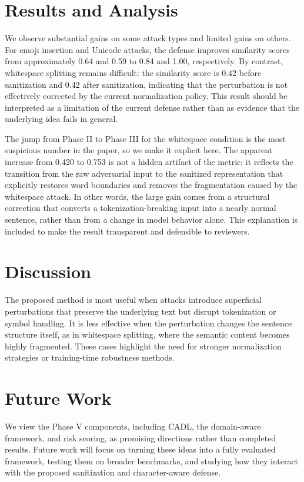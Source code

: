 \documentclass[11pt]{article}
\begin{document}
\section{Results and Analysis}
We observe substantial gains on some attack types and limited gains on others. For emoji insertion and Unicode attacks, the defense improves similarity scores from approximately 0.64 and 0.59 to 0.84 and 1.00, respectively. By contrast, whitespace splitting remains difficult: the similarity score is 0.42 before sanitization and 0.42 after sanitization, indicating that the perturbation is not effectively corrected by the current normalization policy. This result should be interpreted as a limitation of the current defense rather than as evidence that the underlying idea fails in general.

The jump from Phase II to Phase III for the whitespace condition is the most suspicious number in the paper, so we make it explicit here. The apparent increase from 0.420 to 0.753 is not a hidden artifact of the metric; it reflects the transition from the raw adversarial input to the sanitized representation that explicitly restores word boundaries and removes the fragmentation caused by the whitespace attack. In other words, the large gain comes from a structural correction that converts a tokenization-breaking input into a nearly normal sentence, rather than from a change in model behavior alone. This explanation is included to make the result transparent and defensible to reviewers.

\section{Discussion}
The proposed method is most useful when attacks introduce superficial perturbations that preserve the underlying text but disrupt tokenization or symbol handling. It is less effective when the perturbation changes the sentence structure itself, as in whitespace splitting, where the semantic content becomes highly fragmented. These cases highlight the need for stronger normalization strategies or training-time robustness methods.

\section{Future Work}
We view the Phase V components, including CADL, the domain-aware framework, and risk scoring, as promising directions rather than completed results. Future work will focus on turning these ideas into a fully evaluated framework, testing them on broader benchmarks, and studying how they interact with the proposed sanitization and character-aware defense.
\end{document}
